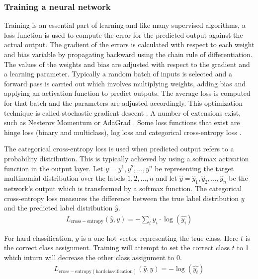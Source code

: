 \documentclass[a4paper, 11pt]{article}
\begin{document}
\subsubsection{Training a neural network}

Training is an essential part of learning and like many supervised algorithms, a loss function is used to compute the error for the predicted output against the actual output. The gradient of the errors is calculated with respect to each weight and bias variable by propagating backward using the chain rule of differentiation. The values of the weights and bias are adjusted with respect to the gradient and a learning parameter. Typically a random batch of inputs is selected and a forward pass is carried out which involves multiplying weights, adding bias and applying an activation function to predict outputs. The average loss is computed for that batch and the parameters are adjusted accordingly. This optimization technique is called stochastic gradient descent \parencite{Bottou2012}. A number of extensions exist, such as Nesterov Momentum \parencite{Sutskever2013} or AdaGrad \parencite{Duchi2011}. Some loss functions that exist are hinge loss (binary and multiclass), log loss and categorical cross-entropy loss \parencite{Goldberg2016}. 


The categorical cross-entropy loss is used when predicted output refers to a probability distribution. This is typically achieved by using a softmax activation function in the output layer. Let $y = y^{1}, y^{2}, \dots, y^{n}$ be representing the target multinomial distribution over the labels $1,2,\dots,n$ and let $ \hat{y} = \hat{y}_{1},\hat{y}_{2},\dots,\hat{y}_{n}$ be the network's output which is transformed by a softmax function. The categorical cross-entropy loss measures the difference between the true label distribution $y$ and the predicted label distribution $\hat{y}$. 
\begin{align*}
L_\mathrm{cross-entropy}(\hat{y},y) = -\sum_iy_i \cdot \log(\hat{y_i})
\end{align*}

For hard classification, $y$ is a one-hot vector representing the true class. Here $t$ is the correct class assignment. Training will attempt to set the correct class $t$ to 1 which inturn will decrease the other class assignment to 0.
\begin{align*}
L_{\mathrm{cross-entropy(hard classification)}}(\hat{y},y) = -\log(\hat{y_t})
\end{align*}
\end{document}
